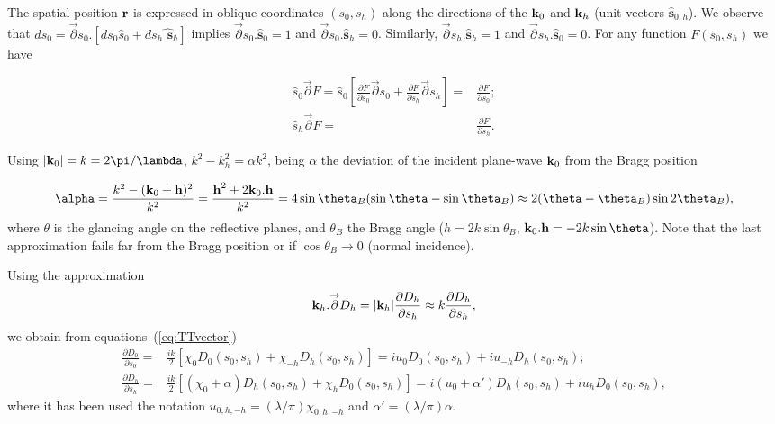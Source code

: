 \documentclass[preprint]{iucr}              %
\newcommand{\inred}[1]{{\color{red}#1}}
\begin{document}
The spatial position $\textbf r$ is expressed in oblique coordinates $(s_0,s_h)$ along the directions of the $\textbf k_0$ and $\textbf k_h$ (unit vectors $\hat{ \textbf{s}}_{0,h}$). We observe that $d s_0 = \overset{\rightarrow} \partial s_0 . [ d s_0 \hat s_0 + d s_h \hat{\textbf{ s}}_h ]$ implies $\overset{\rightarrow} \partial s_0 . \hat{\textbf{s}}_0=1$ and $\overset{\rightarrow} \partial s_0 . \hat{\textbf{s}}_h=0$. Similarly, $\overset{\rightarrow} \partial s_h . \hat{\textbf{s}}_h=1$ and $\overset{\rightarrow} \partial s_h . \hat{\textbf{s}}_0=0$. For any function $F(s_0,s_h)$ we have 

\begin{subequations}
\label{eq:equalities}
\begin{align}
\hat s_0 \overset{\rightarrow} \partial F=
\hat s_0 \left[ 
\frac{\partial F}{\partial s_0} \overset{\rightarrow} \partial s_0 + 
\frac{\partial F}{\partial s_h} \overset{\rightarrow} \partial s_h \right] 
=& \frac{\partial F}{\partial s_0}
; \\
\hat s_h \overset{\rightarrow} \partial F =& 
\frac{\partial F}{\partial s_h}.
\end{align}
\end{subequations}

\inred{Using $|\textbf k_0| = k = 2 \pi / \lambda$, $k^2 - k_h^2 = \alpha k^2$, being $\alpha$ the deviation of the incident plane-wave $\textbf k_0$ from the Bragg position}

\begin{equation}
\label{eq:alpha}
\alpha = \frac{k^2-(\textbf k_0 + \textbf h)^2}{k^2} = \frac{\textbf h^2 + 2 \textbf k_0 . \textbf h}{k^2} = 4 \sin \theta_B (\sin \theta - \sin \theta_B) \approx 2 (\theta-\theta_B) \sin 2\theta_B),
\end{equation}
where $\theta$ is the glancing angle on the reflective planes, and $\theta_B$ the Bragg angle ($h=2 k \sin\theta_B$, $\textbf k_0 . \textbf h = -2 k \sin\theta$). Note that the last approximation fails far from the Bragg position or if $\cos\theta_B \rightarrow 0$ (normal incidence). 

Using the approximation
\begin{equation}
\label{eq:approxKH}
\textbf k_h . \overset{\rightarrow} \partial D_h = |\textbf k_h| \frac{\partial D_h}{\partial s_h} \approx k \frac{\partial D_h}{ \partial s_h},
\end{equation}
we obtain from equations~(\ref{eq:TTvector})
\begin{subequations}
\label{eq:TT}
\begin{align}
\frac{\partial D_0}{\partial s_0} =& \frac{ik}{2} \left[ \chi_0 D_0(s_0,s_h)+ \chi_{-h} D_h(s_0,s_h) \right]
= i u_0 D_0(s_0,s_h) + i u_{-h} D_h(s_0,s_h); \\
\frac{\partial D_h}{\partial s_h} =& \frac{ik}{2} \left[ (\chi_0 + \alpha) D_h(s_0,s_h)+ \chi_{h} D_0(s_0,s_h) \right] = i (u_0 + \alpha') D_h(s_0,s_h) + i u_{h} D_0(s_0,s_h),
\end{align}
\end{subequations}
where it has been used the notation $u_{0,h,-h}=(\lambda/\pi) \chi_{0,h,-h}$ and $\alpha' = (\lambda/\pi) \alpha$.
\end{document}
